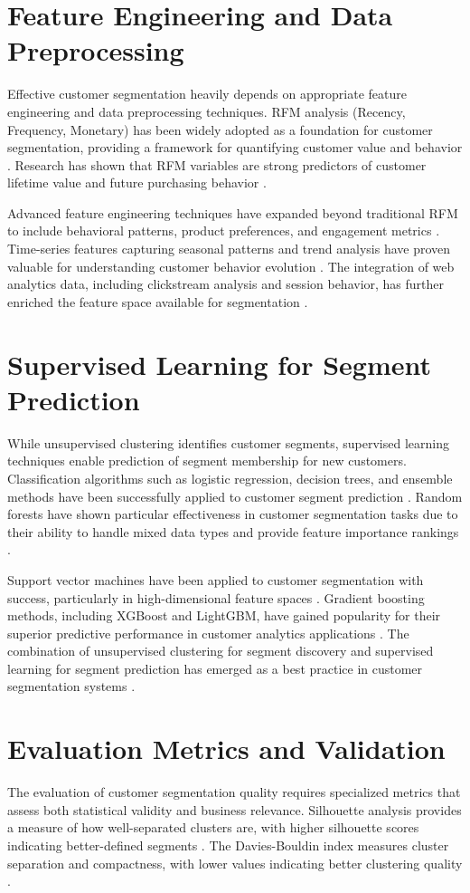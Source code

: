 \documentclass[12pt,a4paper]{report}
\begin{document}
\section{Feature Engineering and Data Preprocessing}
Effective customer segmentation heavily depends on appropriate feature engineering and data preprocessing techniques. RFM analysis (Recency, Frequency, Monetary) has been widely adopted as a foundation for customer segmentation, providing a framework for quantifying customer value and behavior \cite{hughes1994}. Research has shown that RFM variables are strong predictors of customer lifetime value and future purchasing behavior \cite{fader2005}.

\noindent
Advanced feature engineering techniques have expanded beyond traditional RFM to include behavioral patterns, product preferences, and engagement metrics \cite{verhoef2010}. Time-series features capturing seasonal patterns and trend analysis have proven valuable for understanding customer behavior evolution \cite{neslin2006}. The integration of web analytics data, including clickstream analysis and session behavior, has further enriched the feature space available for segmentation \cite{moe2003}.

\section{Supervised Learning for Segment Prediction}
While unsupervised clustering identifies customer segments, supervised learning techniques enable prediction of segment membership for new customers. Classification algorithms such as logistic regression, decision trees, and ensemble methods have been successfully applied to customer segment prediction \cite{hastie2009}. Random forests have shown particular effectiveness in customer segmentation tasks due to their ability to handle mixed data types and provide feature importance rankings \cite{breiman2001}.

\noindent
Support vector machines have been applied to customer segmentation with success, particularly in high-dimensional feature spaces \cite{vapnik1995}. Gradient boosting methods, including XGBoost and LightGBM, have gained popularity for their superior predictive performance in customer analytics applications \cite{chen2016}. The combination of unsupervised clustering for segment discovery and supervised learning for segment prediction has emerged as a best practice in customer segmentation systems \cite{kumar2006}.

\section{Evaluation Metrics and Validation}
The evaluation of customer segmentation quality requires specialized metrics that assess both statistical validity and business relevance. Silhouette analysis provides a measure of how well-separated clusters are, with higher silhouette scores indicating better-defined segments \cite{rousseeuw1987}. The Davies-Bouldin index measures cluster separation and compactness, with lower values indicating better clustering quality \cite{davies1979}.
\end{document}
